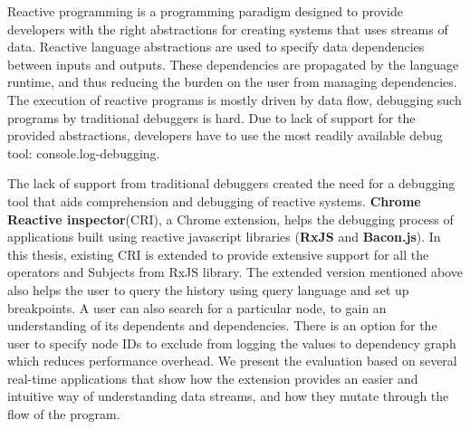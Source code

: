 
Reactive programming is a programming paradigm designed to provide developers with the
right abstractions for creating systems that uses streams of data. Reactive language abstractions are used to specify data dependencies between inputs and outputs. These dependencies are propagated by the language runtime, and thus reducing the burden on the user from managing dependencies. The execution of reactive programs is mostly driven by data flow, debugging such programs by traditional debuggers is hard. Due to lack of support for the provided abstractions, developers have to use the most readily available debug tool: console.log-debugging.


\vspace*{0.05in}

The lack of support from traditional debuggers created the need for a debugging tool that aids comprehension and debugging of reactive systems. 
\textbf{Chrome Reactive inspector}(CRI), a Chrome extension, helps the debugging process of applications built using reactive javascript libraries
(\textbf{RxJS} and \textbf{Bacon.js}). In this thesis, existing CRI is extended to provide extensive support for all the operators and Subjects from RxJS library. The extended version mentioned above also helps the user to query the history using query language and set up breakpoints. A user can also search for a particular node, to gain an understanding of its dependents and dependencies. There is an option for the user to specify node IDs to exclude from logging the values to dependency graph which reduces performance overhead. We present the evaluation based on several real-time applications that show how the extension provides an easier and intuitive way of understanding data streams, and how they mutate through the flow of the program.

